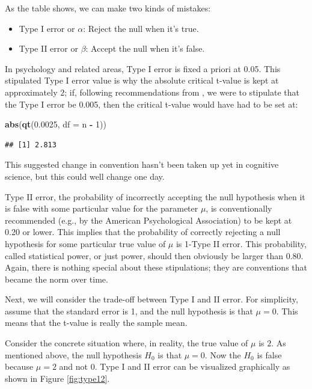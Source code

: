 \documentclass[12pt,]{krantz}
\newenvironment{Shaded}{\begin{snugshade}}{\end{snugshade}}
\newcommand{\DataTypeTok}[1]{\textcolor[rgb]{0.13,0.29,0.53}{#1}}
\newcommand{\DecValTok}[1]{\textcolor[rgb]{0.00,0.00,0.81}{#1}}
\newcommand{\FloatTok}[1]{\textcolor[rgb]{0.00,0.00,0.81}{#1}}
\newcommand{\KeywordTok}[1]{\textcolor[rgb]{0.13,0.29,0.53}{\textbf{#1}}}
\newcommand{\NormalTok}[1]{#1}
\newcommand{\OperatorTok}[1]{\textcolor[rgb]{0.81,0.36,0.00}{\textbf{#1}}}
\newcommand{\StringTok}[1]{\textcolor[rgb]{0.31,0.60,0.02}{#1}}
\providecommand{\tightlist}{%
  \setlength{\itemsep}{0pt}\setlength{\parskip}{0pt}}
\begin{document}
As the table shows, we can make two kinds of mistakes:

\begin{itemize}
\tightlist
\item
  Type I error or \(\alpha\): Reject the null when it's true.
\item
  Type II error or \(\beta\): Accept the null when it's false.
\end{itemize}

In psychology and related areas, Type I error is fixed a priori at 0.05. This stipulated Type I error value is why the absolute critical t-value is kept at approximately \(2\); if, following recommendations from \citet{benjamin2018redefine}, we were to stipulate that the Type I error be 0.005, then the critical t-value would have had to be set at:

\begin{Shaded}
\begin{Highlighting}[]
\KeywordTok{abs}\NormalTok{(}\KeywordTok{qt}\NormalTok{(}\FloatTok{0.0025}\NormalTok{, }\DataTypeTok{df =}\NormalTok{ n }\OperatorTok{-}\StringTok{ }\DecValTok{1}\NormalTok{))}
\end{Highlighting}
\end{Shaded}

\begin{verbatim}
## [1] 2.813
\end{verbatim}

This suggested change in convention hasn't been taken up yet in cognitive science, but this could well change one day.

Type II error, the probability of incorrectly accepting the null hypothesis when it is false with some particular value for the parameter \(\mu\), is conventionally recommended (e.g., by the American Psychological Association) to be kept at 0.20 or lower. This implies that the probability of correctly rejecting a null hypothesis for some particular true value of \(\mu\) is 1-Type II error. This probability, called statistical power, or just power, should then obviously be larger than 0.80. Again, there is nothing special about these stipulations; they are conventions that became the norm over time.

Next, we will consider the trade-off between Type I and II error. For simplicity, assume that the standard error is 1, and the null hypothesis is that \(\mu=0\). This means that the t-value is really the sample mean.

Consider the concrete situation where, in reality, the true value of \(\mu\) is \(2\). As mentioned above, the null hypothesis \(H_0\) is that \(\mu=0\). Now the \(H_0\) is false because \(\mu=2\) and not \(0\). Type I and II error can be visualized graphically as shown in Figure \ref{fig:type12}.
\end{document}
